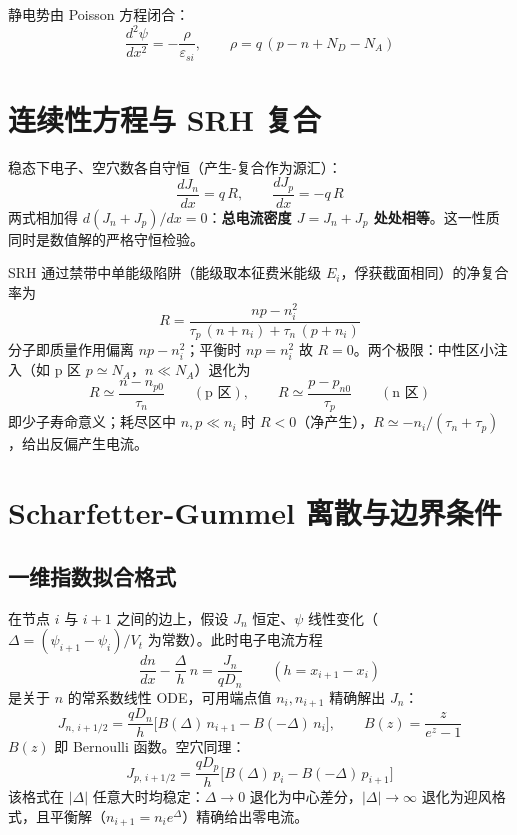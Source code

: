 \documentclass[11pt]{ctexart}
\begin{document}
静电势由 Poisson 方程闭合：
\[\frac{d^2\psi}{dx^2}=-\frac{\rho}{\varepsilon_{si}},\qquad \rho=q\,(p-n+N_D-N_A)\]

\section{连续性方程与 SRH 复合}

稳态下电子、空穴数各自守恒（产生-复合作为源汇）：
\[\frac{dJ_n}{dx}=q\,R,\qquad \frac{dJ_p}{dx}=-q\,R\]
两式相加得 $d(J_n+J_p)/dx=0$：\textbf{总电流密度 $J=J_n+J_p$ 处处相等}。这一性质同时是数值解的严格守恒检验。

SRH 通过禁带中单能级陷阱（能级取本征费米能级 $E_i$，俘获截面相同）的净复合率为
\[R=\frac{np-n_i^2}{\tau_p\,(n+n_i)+\tau_n\,(p+n_i)}\]
分子即质量作用偏离 $np-n_i^2$；平衡时 $np=n_i^2$ 故 $R=0$。两个极限：中性区小注入（如 p 区 $p\simeq N_A$，$n\ll N_A$）退化为
\[R\simeq\frac{n-n_{p0}}{\tau_n}\qquad(\text{p 区}),\qquad R\simeq\frac{p-p_{n0}}{\tau_p}\qquad(\text{n 区})\]
即少子寿命意义；耗尽区中 $n,p\ll n_i$ 时 $R<0$（净产生），$R\simeq -n_i/(\tau_n+\tau_p)$，给出反偏产生电流。

\section{Scharfetter-Gummel 离散与边界条件}

\subsection{一维指数拟合格式}
在节点 $i$ 与 $i+1$ 之间的边上，假设 $J_n$ 恒定、$\psi$ 线性变化（$\Delta=(\psi_{i+1}-\psi_i)/V_t$ 为常数）。此时电子电流方程
\[\frac{dn}{dx}-\frac{\Delta}{h}\,n=\frac{J_n}{qD_n}\qquad(h=x_{i+1}-x_i)\]
是关于 $n$ 的常系数线性 ODE，可用端点值 $n_i,n_{i+1}$ 精确解出 $J_n$：
\[J_{n,\,i+1/2}=\frac{qD_n}{h}\Big[B(\Delta)\,n_{i+1}-B(-\Delta)\,n_i\Big],\qquad B(z)=\frac{z}{e^z-1}\]
$B(z)$ 即 Bernoulli 函数。空穴同理：
\[J_{p,\,i+1/2}=\frac{qD_p}{h}\Big[B(\Delta)\,p_i-B(-\Delta)\,p_{i+1}\Big]\]
该格式在 $|\Delta|$ 任意大时均稳定：$\Delta\to0$ 退化为中心差分，$|\Delta|\to\infty$ 退化为迎风格式，且平衡解（$n_{i+1}=n_i e^{\Delta}$）精确给出零电流。
\end{document}
